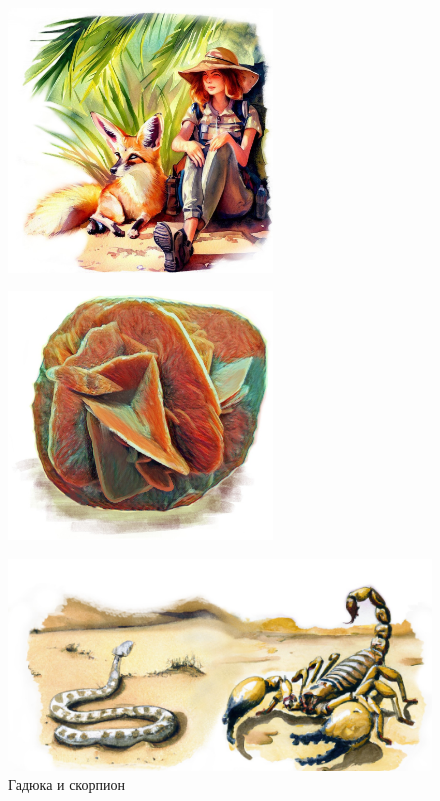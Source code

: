 \documentclass[a5paper,11pt]{memoir}
\begin{document}
\newpage
\begin{figure}
	\centering
	\begin{minipage}[t]{.5\textwidth}
		\centering
		\hspace{-1cm}\includegraphics[width=7cm]{images/oasis-break.jpg}
	\end{minipage}%
	\begin{minipage}[t]{.5\textwidth}
		\centering
		\includegraphics[width=7cm]{images/sahara-desert-rose.jpg}
		\label{fig:desert-rose}
	\end{minipage}
\end{figure}



\begin{figure}[h]
  \centering
  \includegraphics[width=\textwidth]{images/viper-scorpion.jpg}
  \caption{Гадюка и скорпион}
\end{figure}
\end{document}
